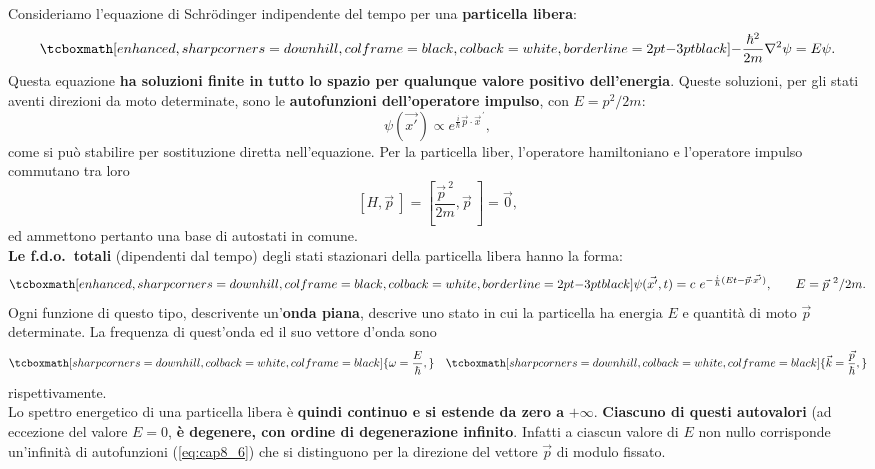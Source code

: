 \documentclass[a4paper,12pt,oneside]{book}
\begin{document}
Consideriamo l'equazione di Schr\"{o}dinger indipendente del tempo per una \textbf{particella libera}:
	\begin{equation}
		\tcboxmath[enhanced, sharp corners=downhill, colframe=black, colback=white, borderline={2pt}{-3pt}{black}]{
			-\frac{\hbar ^2}{2m}\nabla ^2 \psi = E\psi.
			}
	\end{equation}
Questa equazione \textbf{ha soluzioni finite in tutto lo spazio per qualunque valore positivo dell'energia}. Queste soluzioni, per gli stati aventi direzioni da moto determinate, sono le \textbf{autofunzioni dell'operatore impulso}, con $E= p^2/2m$:
	\begin{equation}
		\psi (\vec{x'}) \propto e ^{\frac{i}{\hbar}\vec{p}\cdot {\vec{x}}^{\, \prime}},
	\end{equation}
come si può stabilire per sostituzione diretta nell'equazione. Per la particella liber, l'operatore hamiltoniano e l'operatore impulso commutano tra loro
	\begin{equation}
		\left[ H, \vec{p}\ \right] = \left[ \frac{ {\vec{p}}^{\ 2}}{2m}, \vec{p}\ \right] =\vec{0},
	\end{equation}
ed ammettono pertanto una base di autostati in comune.\\
\textbf{Le f.d.o.~totali} (dipendenti dal tempo) degli stati stazionari della particella libera hanno la forma:
	\begin{equation}
		\tcboxmath[enhanced, sharp corners=downhill, colframe=black, colback=white, borderline={2pt}{-3pt}{black}]{
			\psi (\vec{x'}, t) = c\ e^{-\frac{i}{\hbar} (Et - \vec{p}\cdot \vec{x'})},} \qquad E={\vec{p}}^{\ 2}/{2m}.
	\label{eq:cap8_6}
	\end{equation}
Ogni funzione di questo tipo, descrivente un'\textbf{onda piana}, descrive uno stato in cui la particella ha energia $E$ e quantità di moto $\vec{p}$ determinate. La frequenza di quest'onda ed il suo vettore d'onda sono
	\begin{equation}
		\tcboxmath[sharp corners=downhill, colback=white, colframe=black]{
		\omega = \frac{E}{\hbar},
		} \quad 
	\tcboxmath[sharp corners=downhill, colback=white, colframe=black]{
		\vec{k}= \frac{\vec{p}}{\hbar},
		}
	\end{equation}
rispettivamente.\\

Lo spettro energetico di una particella libera è \textbf{quindi continuo e si estende da zero a} $+\infty$. \textbf{Ciascuno di questi autovalori} (ad eccezione del valore $E=0$, \textbf{è degenere, con ordine di degenerazione infinito}. Infatti a ciascun valore di $E$ non nullo corrisponde un'infinità di autofunzioni (\ref{eq:cap8_6}) che si distinguono per la direzione del vettore $\vec{p}$ di modulo fissato.
\end{document}
